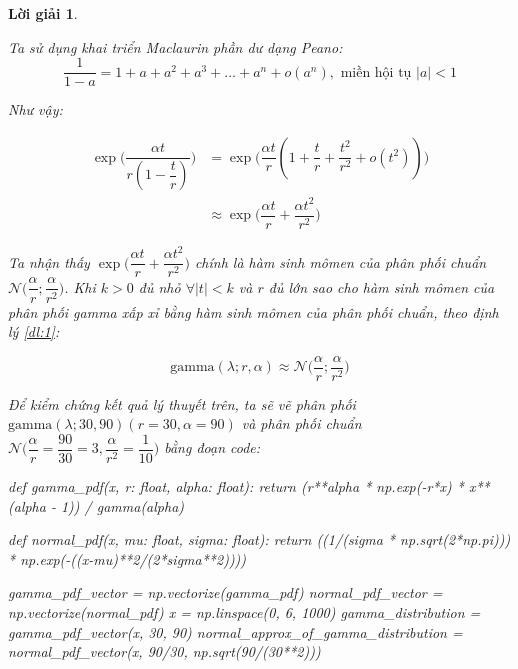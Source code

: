 \documentclass[14pt, a4paper]{article}
\theoremstyle{sltheorem}
\theoremstyle{soltheorem}
\newtheorem*{loigiai}{Lời giải}
\begin{document}
\begin{loigiai}
\begin{enumerate}
        Ta sử dụng khai triển Maclaurin phần dư dạng Peano:
        \begin{equation*}
            \dfrac{1}{1-a} = 1 + a + a^2 + a^3 + \dots + a^n + o(a^n), \text{ miền hội tụ } \lvert a \rvert < 1
        \end{equation*}

        Như vậy:

        \begin{equation*}
            \begin{aligned}
                \exp\Bigg(\dfrac{\alpha t}{r(1 - \dfrac{t}{r})} \Bigg) &= \exp\Bigg(\dfrac{\alpha t}{r}(1 + \dfrac{t}{r} + \dfrac{t^2}{r^2} + o(t^2)) \Bigg) \\
                &\approx \exp\Bigg( \dfrac{\alpha t}{r} + \dfrac{\alpha t^2}{r^2}\Bigg)
            \end{aligned}
        \end{equation*}

        Ta nhận thấy $\exp\Bigg( \dfrac{\alpha t}{r} + \dfrac{\alpha t^2}{r^2}\Bigg)$ chính là hàm sinh mômen của phân phối chuẩn $\mathcal{N}\Big(\dfrac{\alpha}{r}; \dfrac{\alpha}{r^2} \Big)$.
        Khi $k > 0$ đủ nhỏ $\forall \lvert t \rvert <k$ và $r$ đủ lớn sao cho hàm sinh mômen của phân phối gamma xấp xỉ bằng hàm sinh mômen của phân phối chuẩn, theo định lý \ref{dl:1}:

        \begin{equation*}
            \text{gamma}(\lambda; r, \alpha) \approx \mathcal{N}\Big(\dfrac{\alpha}{r};\dfrac{\alpha}{r^2}\Big)
        \end{equation*}

        Để kiểm chứng kết quả lý thuyết trên, ta sẽ vẽ phân phối $\text{gamma}(\lambda; 30, 90) (r=30, \alpha=90)$ và phân phối chuẩn $\mathcal{N}\Big(\dfrac{\alpha}{r}=\dfrac{90}{30}=3, \dfrac{\alpha}{r^2}=\dfrac{1}{10}\Big)$ bằng đoạn code:

        \begin{python}
def gamma_pdf(x, r: float, alpha: float):
    return (r**alpha * np.exp(-r*x) * x**(alpha - 1)) / gamma(alpha)


def normal_pdf(x, mu: float, sigma: float):
    return ((1/(sigma * np.sqrt(2*np.pi))) * np.exp(-((x-mu)**2/(2*sigma**2))))

gamma_pdf_vector = np.vectorize(gamma_pdf)
normal_pdf_vector = np.vectorize(normal_pdf)
x = np.linspace(0, 6, 1000)
gamma_distribution = gamma_pdf_vector(x, 30, 90)
normal_approx_of_gamma_distribution = normal_pdf_vector(x, 90/30, np.sqrt(90/(30**2)))
            

\end{python}
\end{enumerate}
\end{loigiai}
\end{document}
